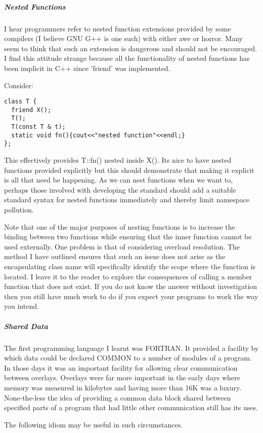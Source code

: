 \documentclass{book}
\begin{document}
\subparagraph{Nested Functions}

I hear programmers refer to nested function extensions provided by some compilers (I believe GNU G++ is one such) with either awe or horror.
Many seem to think that such an extension is dangerous and should not be encouraged.
I find this attitude strange because all the functionality of nested functions has been implicit in C++ since 'friend' was implemented.

Consider:
\begin{lstlisting}
class T {
  friend X();
  T();
  T(const T & t);
  static void fn(){cout<<"nested function"<<endl;}
};
\end{lstlisting}

This effectively provides T::fn() nested inside X().
Its nice to have nested functions provided explicitly but this should demonstrate that making it explicit is all that need be happening.
As we can nest functions when we want to, perhaps those involved with developing the standard should add a suitable standard syntax for nested functions immediately and thereby limit namespace pollution.

Note that one of the major purposes of nesting functions is to increase the binding between two functions while ensuring that the inner function cannot be used externally.
One problem is that of considering overload resolution. 
The method I have outlined ensures that such an issue does not arise as the encapsulating class name will specifically identify the scope where the function is located.
I leave it to the reader to explore the consequences of calling a member function that does not exist.
If you do not know the answer without investigation then you still have much work to do if you expect your programs to work the way you intend.

\subparagraph{Shared Data}

The first programming language I learnt was FORTRAN. It provided a facility by which data could be declared COMMON to a number of modules of a program.
In those days it was an important facility for allowing clear communication between overlays. 
Overlays were far more important in the early days where memory was measured in kilobytes and having more than 16K was a luxury.
None-the-less the idea of providing a common data block shared between specified parts of a program that had little other communication still has its uses.

The following idiom may be useful in such circumstances.
\end{document}
